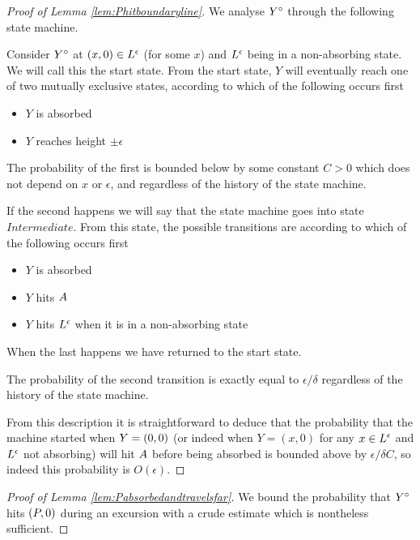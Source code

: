 {\begin{proof}[Proof of Lemma \ref{lem:Phitboundaryline}]
We analyse $Y^\circ$ through the following state machine.

Consider $Y^\circ$ at $(x,0) \in L^\epsilon$ (for some $x$) and $L^\epsilon$ being in
a non-absorbing state.  We will call this the start state.  From the
start state, $Y$ will eventually reach one of two mutually exclusive
states, according to which of the following occurs first

\newcommand{\intermediatelines}{I}

\begin{itemize}
\item $Y$ is absorbed
\item $Y$ reaches height $\pm\epsilon$
\end{itemize}

The probability of the first is bounded below by some constant $C > 0$
which does not depend on $x$ or $\epsilon$, and regardless of the
history of the state machine.

\newcommand{\stateintermediate}{Intermediate}

If the second happens we will say that the state machine goes into
state $\stateintermediate$.  From this state, the possible transitions
are according to which of the following occurs first

\begin{itemize}
\item $Y$ is absorbed
\item $Y$ hits $A$
\item $Y$ hits $L^\epsilon$ when it is in a non-absorbing state
\end{itemize}

When the last happens we have returned to the start state.

The probability of the second transition is exactly equal to
$\epsilon/\delta$ regardless of the history of the state machine.

From this description it is straightforward to deduce that the
probability that the machine started when $Y = (0,0)$ (or indeed when
$Y = (x, 0)$ for any $x \in L^\epsilon$ and $L^\epsilon$ not absorbing) will hit
$A$ before being absorbed is
bounded above by $\epsilon/\delta C$, so indeed this probability is
$O(\epsilon)$.
\end{proof}

\begin{proof}[Proof of Lemma \ref{lem:Pabsorbedandtravelsfar}]
We bound the probability that $Y^\circ$ hits $(P,0)$ during an
excursion with a crude estimate which is nontheless sufficient.


\end{proof}}
